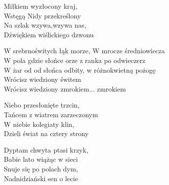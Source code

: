 \begin{text}
    Miłkiem wyzłocony kraj,\\
    Wstęgą Nidy przekreślony\\
    Na szlak wzywa,wzywa nas,\\
    Dźwiękiem wiślickiego dzwonu

    W srebrnoświtych łąk morze, W mrocze średniowiecza\\
    W pola gdzie słońce orze z ranka po odwieczerz\\
    W żar od od słońca odbity, w różnokwietną pożogę\\
    Wrócisz wiedziony świtem\\
    Wrócisz wiedziony zmrokiem... zmrokiem

    Niebo przesłonięte trzcin,\\
    Tańcem z wiatrem zarzeczonym\\
    W niebie kolegiaty klin,\\
    Dzieli świat na cztery strony

    Dyptam chwyta ptasi krzyk,\\
    Babie lato wiążąc w sieci\\
    Snuje się po polach dym,\\
    Nadnidziański sen o lecie
\end{text}
\begin{chord}

\end{chord}